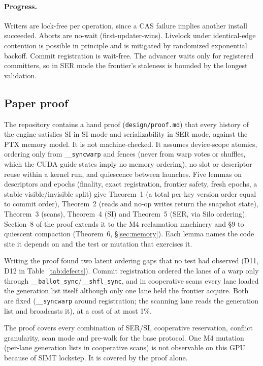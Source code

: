 \documentclass[sigconf,nonacm]{acmart}
\newcommand{\code}[1]{\texttt{#1}}
\begin{document}
\paragraph{Progress.} Writers are lock-free per operation, since a CAS failure implies another install succeeded.
Aborts are no-wait (first-updater-wins). Livelock under identical-edge contention is possible in principle and is
mitigated by randomized exponential backoff. Commit registration is wait-free. The advancer waits only for registered
committers, so in SER mode the frontier's staleness is bounded by the longest validation.

\subsection{Paper proof}
\label{sec:proof}
The repository contains a hand proof (\code{design/proof.md}) that every history of the engine satisfies SI in SI mode
and serializability in SER mode, against the PTX memory model. It is not machine-checked. It assumes device-scope
atomics, ordering only from \code{\_\_syncwarp} and fences (never from warp votes or shuffles, which the CUDA guide
states imply no memory ordering), no slot or descriptor reuse within a kernel run, and quiescence between launches.
Five lemmas on descriptors and epochs (finality, exact registration, frontier safety, fresh epochs, a stable
visible/invisible split) give Theorem~1 (a total per-key version order equal to commit order), Theorem~2 (reads and
no-op writes return the snapshot state), Theorem~3 (scans), Theorem~4 (SI) and Theorem~5 (SER, via Silo ordering).
Section~8 of the proof extends it to the M4 reclamation machinery and \S9 to quiescent compaction (Theorem~6,
\S\ref{sec:memory}). Each lemma names the code site it depends on and the test or mutation that exercises it.

Writing the proof found two latent ordering gaps that no test had observed (D11, D12 in Table~\ref{tab:defects}).
Commit registration ordered the lanes of a warp only through \code{\_\_ballot\_sync}/\code{\_\_shfl\_sync}, and in
cooperative scans every lane loaded the generation list itself although only one lane held the frontier acquire.
Both are fixed (\code{\_\_syncwarp} around registration; the scanning lane reads the generation list and broadcasts
it), at a cost of at most 1\%.

The proof covers every combination of SER/SI, cooperative reservation, conflict granularity, scan mode and pre-walk
for the base protocol. One M4 mutation (per-lane generation lists in cooperative scans) is not observable on this GPU
because of SIMT lockstep. It is covered by the proof alone.
\end{document}
